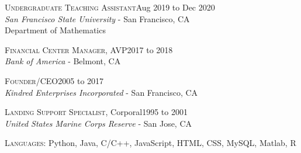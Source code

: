 \documentclass[hidelinks, 10pt]{article}
\begin{document}
{\vspace{2.5mm}

\begin{minipage}[ct]{0.9\linewidth}
    \textsc{Undergraduate Teaching Assistant}\hfill Aug 2019 to Dec 2020\\
    {\emph{San Francisco State University} - San Francisco, CA}\\
    Department of Mathematics
\end{minipage}

\vspace{2.5mm}

\begin{minipage}[ct]{0.9\linewidth}
    \textsc{Financial Center Manager}, AVP\hfill 2017 to 2018\\
    {\emph{Bank of America} - Belmont, CA}
\end{minipage}

\vspace{2.5mm}

\begin{minipage}[ct]{0.9\linewidth}
    \textsc{Founder/CEO}\hfill 2005 to 2017\\
    {\emph{Kindred Enterprises Incorporated} - San Francisco, CA}
\end{minipage}

\vspace{2.5mm}

\begin{minipage}[ct]{0.9\linewidth}
    \textsc{Landing Support Specialist}, Corporal\hfill 1995 to 2001\\
    {\emph{United States Marine Corps Reserve} - San Jose, CA}
\end{minipage}

\vspace{7mm}


\hrulefill

\vspace{4mm}

\begin{minipage}[ct]{0.9\linewidth}
    \textsc{Languages: } Python, Java, C/C++, JavaScript, HTML, CSS, MySQL, Matlab, R




\end{minipage}}
\end{document}
